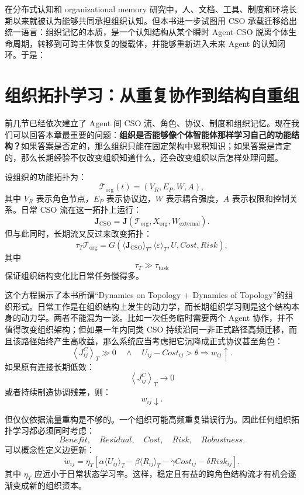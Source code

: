 在分布式认知和 organizational memory 研究中，人、文档、工具、制度和环境长期以来就被认为能够共同承担组织认知。但本书进一步试图用 CSO 承载迁移给出统一语言：组织记忆的本质，是一个认知结构从某个瞬时 Agent-CSO 脱离个体生命周期，转移到可跨主体恢复的慢载体，并能够重新进入未来 Agent 的认知闭环。于是：
\begin{statementbox}
\centering
{}
\end{statementbox}


\section{组织拓扑学习：从重复协作到结构自重组}
\label{sec:organizational-topology-learning}

前几节已经依次建立了 Agent 间 CSO 流、角色、协议、制度和组织记忆。现在我们可以回答本章最重要的问题：\textbf{组织是否能够像个体智能体那样学习自己的功能结构？}如果答案是否定的，那么组织只能在固定架构中累积知识；如果答案是肯定的，那么长期经验不仅改变组织知道什么，还会改变组织以后怎样处理问题。

设组织的功能拓扑为：
\[
\mathcal T_{\mathrm{org}}(t)
=
(V_R,E_P,W,A),
\]
其中 $V_R$ 表示角色节点，$E_P$ 表示协议边，$W$ 表示耦合强度，$A$ 表示权限和控制关系。日常 CSO 流在这一拓扑上运行：
\[
\mathbf J_{\mathrm{CSO}}
=
\mathbf J(
\mathcal T_{\mathrm{org}},
X_{\mathrm{org}},
W_{\mathrm{external}}
).
\]
但与此同时，长期流又反过来改变拓扑：
\[
\tau_T
\dot{\mathcal T}_{\mathrm{org}}
=
G(
\langle\mathbf J_{\mathrm{CSO}}\rangle_T,
\langle\varepsilon\rangle_T,
U,
Cost,
Risk
),
\]
其中
\[
\tau_T
\gg
\tau_{\mathrm{task}}
\]
保证组织结构变化比日常任务慢得多。

这个方程揭示了本书所谓“Dynamics on Topology + Dynamics of Topology”的组织形式。日常工作是在组织结构上发生的动力学，而长期组织学习则是这个结构本身的动力学。两者不能混为一谈。比如一次任务临时需要两个 Agent 协作，并不值得改变组织架构；但如果一年内同类 CSO 持续沿同一非正式路径高频迁移，而且该路径始终产生高收益，那么系统应当考虑把它沉降成正式协议甚至角色：
\[
\left\langle
J^{C}_{ij}
\right\rangle_T
\gg 0
\quad\land\quad
U_{ij}-Cost_{ij}>\theta
\Rightarrow
w_{ij}\uparrow.
\]
如果原有连接长期低效：
\[
\left\langle
J^C_{ij}
\right\rangle_T\rightarrow0
\]
或者持续制造协调残差，则：
\[
w_{ij}\downarrow.
\]

但仅仅依据流量重构是不够的。一个组织可能高频重复错误行为。因此任何组织拓扑学习都必须同时考虑：
\[
Benefit,\quad Residual,\quad Cost,\quad Risk,\quad Robustness.
\]
可以概念性定义边更新：
\[
\dot w_{ij}
=
\eta_T
\left[
\alpha
\langle U_{ij}\rangle_T
-
\beta
\langle R_{ij}\rangle_T
-
\gamma Cost_{ij}
-
\delta Risk_{ij}
\right].
\]
其中 $\eta_T$ 应远小于日常状态学习率。这样，稳定且有益的跨角色结构流才有机会逐渐变成新的组织资本。

